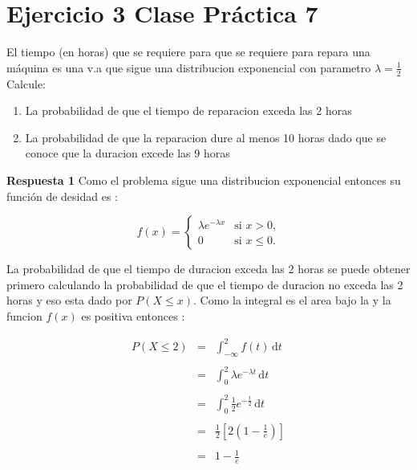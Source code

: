 \documentclass{article}
\begin{document}
    \section*{Ejercicio 3 Clase Pr\'actica 7}

    \begin{flushleft}

        El tiempo (en horas) que se requiere para que se requiere para repara una m\'aquina es una v.a 
        que sigue una distribucion exponencial con parametro $ \lambda = \frac{1}{2} $ Calcule: 
        \begin{enumerate}
            \item La probabilidad de que el tiempo de reparacion exceda las 2 horas 
            \item La probabilidad de que la reparacion dure al menos 10 horas dado que se conoce que
            la duracion excede las 9 horas 
        \end{enumerate} 
        
        {\bf Respuesta 1 } 
        Como el problema sigue una distribucion exponencial entonces su funci\'on de desidad es : 

        
        \begin{equation*}
            f(x)=\begin{cases}
                \lambda e^{-\lambda x }  & \mbox{si $x>0$,}
                \\
                0                        & \mbox{si $x\le 0$.}
                \end{cases}
        \end{equation*}

        La probabilidad de que el tiempo de duracion exceda las 2 horas se 
        puede obtener primero calculando la probabilidad de que el tiempo de 
        duracion no exceda las 2 horas  y eso esta dado por $P \left(X \le x\right)$. 
        Como la integral es el area bajo la y la funcion $f\left(x\right) $ es positiva 
        entonces : 
        


        \begin{equation*}
            \begin{array}{rcl}
                P \left(X \le 2 \right) & = & \int_{ - \infty   }^{2}  f\left(t\right)\,\mathrm{d}t
                \\\\
                                        & = & \int_{0 }^{2}  \lambda e^{- \lambda t}\,\mathrm{d}t
                \\\\
                                        & = & \int_{0 }^{2}  \frac{1}{2} e^{- \frac{t}{2} }\,\mathrm{d}t
                \\\\
                                        & = & \frac{1}{2} \left[2 \left(1-\frac{1}{e}\right)\right]
                \\\\
                                        & = & 1 - \frac{1}{e}
            \end{array}
        \end{equation*}
        


\end{flushleft}
\end{document}
